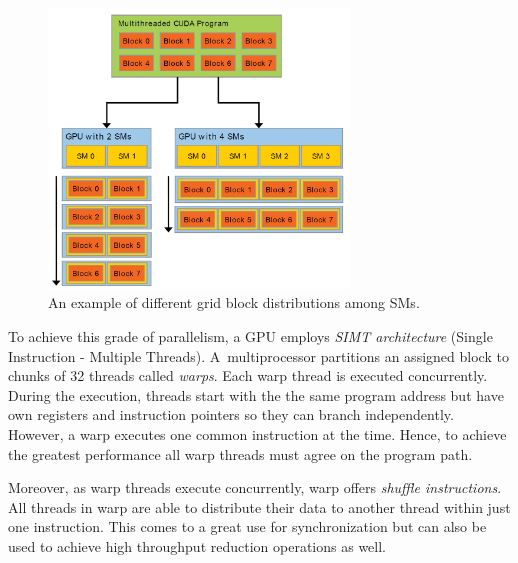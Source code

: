 \begin{figure}\centering
 	\includegraphics[width=8cm]{img/SM}
 	\caption{An example of different grid block distributions among SMs.}
 	\label{fig02:SM}
\end{figure}

To achieve this grade of parallelism, a GPU employs \emph{SIMT architecture} (Single Instruction - Multiple Threads). A~multiprocessor partitions an assigned block to chunks of 32 threads called \emph{warps}. Each warp thread is executed concurrently. During the execution, threads start with the the same program address but have own registers and instruction pointers so they can branch independently. However, a warp executes one common instruction at the time. Hence, to achieve the greatest performance all warp threads must agree on the program path.

Moreover, as warp threads execute concurrently, warp offers \emph{shuffle instructions}. All threads in warp are able to distribute their data to another thread within just one instruction. This comes to a great use for synchronization but can also be used to achieve high throughput reduction operations as well.
